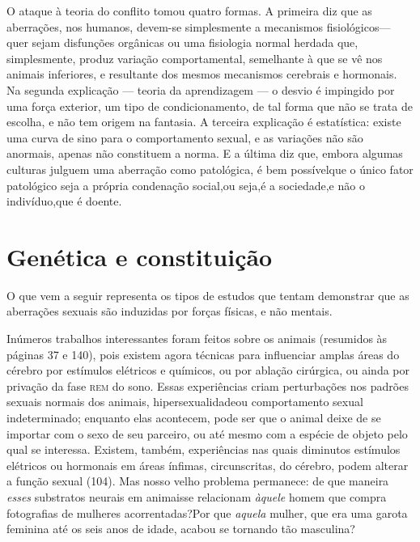  O ataque à teoria do conflito tomou quatro formas. A primeira diz que
as aberrações, nos humanos, devem-se simplesmente a mecanismos
fisiológicos\idxaberrfisic[|(] --- quer sejam disfunções orgânicas ou uma fisiologia normal
herdada que, simplesmente, produz variação comportamental, semelhante à
que se vê nos animais inferiores, e resultante dos mesmos mecanismos
cerebrais e hormonais. Na segunda explicação --- teoria da aprendizagem\idxsocia{} ---
o desvio é impingido por uma força exterior, um tipo de
condicionamento, de tal forma que não se trata de escolha, e não tem
origem na fantasia. A terceira explicação é\idxestat{} estatística:\idxaberrestat{} existe uma
curva de sino para o comportamento sexual, e as variações não são
anormais, apenas não constituem a norma. E a última diz que, embora
algumas culturas\idxrela{} julguem uma aberração como patológica, é bem possível\idxsexopteor[|)]
que o único fator patológico seja a própria condenação social,\idxconf[|)] ou seja,\idxsexuateo[|)]
é a sociedade,\idxfreudsexua[|)] e não o indivíduo,\idxfreud[|)] que é doente.

\section{Genética e constituição}

 O que vem\idxgenet{} a seguir representa os tipos de estudos que tentam demonstrar
que as aberrações sexuais são induzidas por forças físicas, e não
mentais.

 Inúmeros trabalhos interessantes foram feitos sobre os animais
(resumidos às páginas 37 e 140), pois existem agora técnicas para
influenciar amplas áreas do cérebro por estímulos elétricos e químicos, ou por ablação cirúrgica, ou ainda por privação da fase \textsc{rem} do sono. Essas experiências criam perturbações nos padrões sexuais normais dos animais,\idxhiper{} hipersexualidade\idxcerebhipe[|(] ou comportamento sexual indeterminado; enquanto elas acontecem, pode ser que o animal deixe de se importar com o sexo de seu parceiro, ou até mesmo com a espécie de objeto pelo qual se interessa. Existem, também, experiências nas quais diminutos estímulos elétricos ou hormonais em áreas ínfimas, circunscritas, do cérebro, podem alterar a função sexual (104). Mas nosso velho problema permanece: de que maneira \textit{esses} substratos neurais em animais\idxaberranim[|)] se relacionam \textit{àquele} homem que compra fotografias de mulheres acorrentadas?\idxanim[|)] Por que \textit{aquela} mulher, que era uma garota feminina até os seis anos de idade, acabou se tornando tão masculina?

